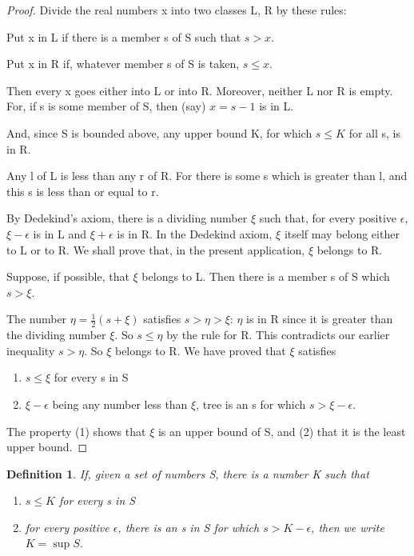 \documentclass[12pt]{scrbook}
\newtheorem*{definition}{Definition}
\begin{document}
\begin{proof}
Divide the real numbers x into two classes L, R by these rules:

Put x in L if there is a member s of S such that $s > x$.

Put x in R if, whatever member s of S is taken, $s \leq x$.

Then every x goes either into L or into R.  Moreover, neither L nor R is empty.  For, if s is some member of S, then (say) $ x = s - 1 $ is in L.

And, since S is bounded above, any upper bound K, for which $s \leq K$ for all s, is in R. 

Any l of L is less than any r of R.  For there is some s which is greater than l, and this s is less than or equal to r.

By Dedekind's axiom, there is a dividing number $\xi$ such that, for every positive $\epsilon$, $\xi - \epsilon$ is in L and $\xi + \epsilon$ is in R.  In the Dedekind axiom, $\xi$ itself may belong either to L or to R.  We shall prove that, in the present application, $\xi$ belongs to R.

Suppose, if possible, that $\xi$ belongs to L.  Then there is a member s of S which $s > \xi$.

The number $\eta = \frac{1}{2}(s + \xi)$ satisfies $ s > \eta > \xi$: $\eta$ is in R since it is greater than the dividing number $\xi$. So $s \leq \eta$ by the rule for R.  This contradicts our earlier inequality $s > \eta$. So $\xi$ belongs to R.  We have proved that $\xi$ satisfies
\begin{enumerate}
	\item $s \leq \xi$ for every s in S
	\item $\xi - \epsilon$ being any number less than $\xi$, tree is an s for which $s > \xi - \epsilon$.
\end{enumerate}
The property (1) shows that $\xi$ is an upper bound of S, and (2) that it is the least upper bound.  
\end{proof}

\begin{definition}
\label{def-supremum}
If, given a set of numbers S, there is a number K such that
\begin{enumerate}
	\item $s \leq K$ for every s in S
	\item for every positive $\epsilon$, there is an s in S for which $s > K - \epsilon$, then we write $K = \sup S$.
\end{enumerate}
\end{definition}
\end{document}
